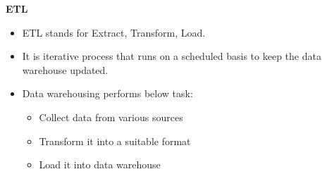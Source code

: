 \begin{flushleft}
	\textbf{ETL}
	\begin{itemize}
		\item ETL stands for Extract, Transform, Load.
		\item It is iterative process that runs on a scheduled basis to keep the data warehouse updated. 
		\item Data warehousing performs below task:
		\begin{itemize}
			\item Collect data from various sources
			\item Transform it into a suitable format
			\item Load it into data warehouse
		\end{itemize}
	\end{itemize}
	
\end{flushleft}

\newpage
